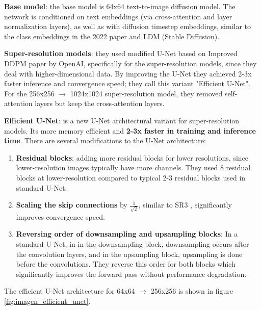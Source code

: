 \textbf{Base model}: the base model is 64x64 text-to-image diffusion model. The network is conditioned on text embeddings (via cross-attention and layer normalization layers), as well as with diffusion timestep embeddings, similar to the class embeddings in the 2022 paper \cite{cascaded_diffusion_models} and LDM (Stable Diffusion).

\textbf{Super-resolution models}: they used modified U-Net based on Improved DDPM paper \cite{openai_improved_ddpm} by OpenAI, specifically for the super-resolution models, since they deal with higher-dimensional data. By improving the U-Net they achieved 2-3x faster inference and convergence speed; they call this variant "Efficient U-Net". For the 256x256 $\rightarrow$ 1024x1024 super-resolution model, they removed self-attention layers but keep the cross-attention layers.

\textbf{Efficient U-Net}: is a new U-Net architectural variant for super-resolution models. Its more memory efficient and \textbf{2-3x faster in training and inference time}. There are several modifications to the U-Net architecture:

\begin{enumerate}
    \item \textbf{Residual blocks}: adding more residual blocks for lower resolutions, since lower-resolution images typically have more channels. They used 8 residual blocks at lower-resolution compared to typical 2-3 residual blocks used in standard U-Net.
    \item \textbf{Scaling the skip connections} by $\frac{1}{\sqrt{2}}$, similar to SR3 \cite{sr3}, significantly improves convergence speed.
    \item \textbf{Reversing order of downsampling and upsampling blocks}: In a standard U-Net, in in the downsampling block, downsampling occurs after the convolution layers, and in the upsampling block, upsampling is done before the convolutions. They reverse this order for both blocks which significantly improves the forward pass without performance degradation.
\end{enumerate}

The efficient U-Net architecture for 64x64 $\rightarrow$ 256x256 is shown in figure \ref{fig:imagen_efficient_unet}.

